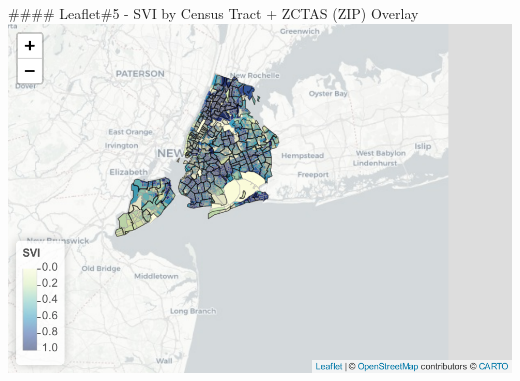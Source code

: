 \documentclass[
]{article}
\begin{document}
\#\#\#\# Leaflet\#5 - SVI by Census Tract + ZCTAS (ZIP) Overlay
\includegraphics{leaflet_files/figure-latex/unnamed-chunk-14-1.pdf}
\end{document}
